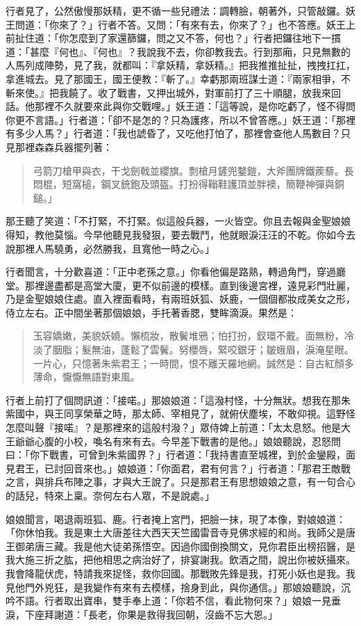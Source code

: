 行者見了，公然傲慢那妖精，更不循一些兒禮法：調轉臉，朝著外，只管敲鑼。妖王問道：「你來了？」行者不答。又問：「有來有去，你來了？」也不答應。妖王上前扯住道：「你怎麼到了家還篩鑼，問之又不答，何也？」行者把鑼往地下一摜道：「甚麼『何也』、『何也』？我說我不去，你卻教我去。行到那廂，只見無數的人馬列成陣勢，見了我，就都叫：『拿妖精，拿妖精。』把我推推扯扯，拽拽扛扛，拿進城去。見了那國王，國王便教：『斬了。』幸虧那兩班謀士道：『兩家相爭，不斬來使。』把我饒了。收了戰書，又押出城外，對軍前打了三十順腿，放我來回話。他那裡不久就要來此與你交戰哩。」妖王道：「這等說，是你吃虧了，怪不得問你更不言語。」行者道：「卻不是怎的？只為護疼，所以不曾答應。」妖王道：「那裡有多少人馬？」行者道：「我也諕昏了，又吃他打怕了，那裡會查他人馬數目？只見那裡森森兵器擺列著：
\begin{quote}
弓箭刀槍甲與衣，干戈劍戟並纓旗。剽槍月鏟兜鍪鎧，大斧團牌鐵蒺藜。長悶棍，短窩槌，鋼叉銃鉋及頭盔。打扮得䩺鞋護頂並胖襖，簡鞭神彈與銅鎚。」
\end{quote}

那王聽了笑道：「不打緊，不打緊。似這般兵器，一火皆空。你且去報與金聖娘娘得知，教他莫惱。今早他聽見我發狠，要去戰鬥，他就眼淚汪汪的不乾。你如今去說那裡人馬驍勇，必然勝我，且寬他一時之心。」

行者聞言，十分歡喜道：「正中老孫之意。」你看他偏是路熟，轉過角門，穿過廳堂。那裡邊盡都是高堂大廈，更不似前邊的模樣。直到後邊宮裡，遠見彩門壯麗，乃是金聖娘娘住處。直入裡面看時，有兩班妖狐、妖鹿，一個個都妝成美女之形，侍立左右。正中間坐著那個娘娘，手托著香腮，雙眸滴淚。果然是：
\begin{quote}
玉容嬌嫩，美貌妖嬈。懶梳妝，散鬢堆鴉；怕打扮，釵環不戴。面無粉，冷淡了胭脂；髮無油，蓬鬆了雲鬢。努櫻唇，緊咬銀牙；皺蛾眉，淚淹星眼。一片心，只憶著朱紫君王；一時間，恨不離天羅地網。誠然是：自古紅顏多薄命，懨懨無語對東風。
\end{quote}

行者上前打了個問訊道：「接喏。」那娘娘道：「這潑村怪，十分無狀。想我在那朱紫國中，與王同享榮華之時，那太師、宰相見了，就俯伏塵埃，不敢仰視。這野怪怎麼叫聲『接喏』？是那裡來的這般村潑？」眾侍婢上前道：「太太息怒。他是大王爺爺心腹的小校，喚名有來有去。今早差下戰書的是他。」娘娘聽說，忍怒問曰：「你下戰書，可曾到朱紫國界？」行者道：「我持書直至城裡，到於金鑾殿，面見君王，已討回音來也。」娘娘道：「你面君，君有何言？」行者道：「那君王敵戰之言，與排兵布陣之事，才與大王說了。只是那君王有思想娘娘之意，有一句合心的話兒，特來上稟。奈何左右人眾，不是說處。」

娘娘聞言，喝退兩班狐、鹿。行者掩上宮門，把臉一抹，現了本像，對娘娘道：「你休怕我。我是東土大唐差往大西天天竺國雷音寺見佛求經的和尚。我師父是唐王御弟唐三藏。我是他大徒弟孫悟空。因過你國倒換關文，見你君臣出榜招醫，是我大施三折之肱，把他相思之病治好了，排宴謝我。飲酒之間，說出你被妖攝來。我會降龍伏虎，特請我來捉怪，救你回國。那戰敗先鋒是我，打死小妖也是我。我見他門外兇狂，是我變作有來有去模樣，捨身到此，與你通信。」那娘娘聽說，沉吟不語。行者取出寶串，雙手奉上道：「你若不信，看此物何來？」娘娘一見垂淚，下座拜謝道：「長老，你果是救得我回朝，沒齒不忘大恩。」


